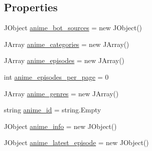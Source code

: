 \subsection*{Properties}
\begin{DoxyCompactItemize}
\item 
J\+Object \mbox{\hyperlink{class_little_weeb_library_1_1_models_1_1_json_kitsu_anime_info_aca4b832adca7f1916bee332b2b8b312f}{anime\+\_\+bot\+\_\+sources}} = new J\+Object()
\item 
J\+Array \mbox{\hyperlink{class_little_weeb_library_1_1_models_1_1_json_kitsu_anime_info_aaaa63157f78ca2cb7b9c08ba4092d6be}{anime\+\_\+categories}} = new J\+Array()
\item 
J\+Array \mbox{\hyperlink{class_little_weeb_library_1_1_models_1_1_json_kitsu_anime_info_ae788c0962dabe5e210fba53aecae820d}{anime\+\_\+episodes}} = new J\+Array()
\item 
int \mbox{\hyperlink{class_little_weeb_library_1_1_models_1_1_json_kitsu_anime_info_a11a2513ce95fe17d206eeb738811d087}{anime\+\_\+episodes\+\_\+per\+\_\+page}} = 0
\item 
J\+Array \mbox{\hyperlink{class_little_weeb_library_1_1_models_1_1_json_kitsu_anime_info_a72957f03d160801021514febcf127b8b}{anime\+\_\+genres}} = new J\+Array()
\item 
string \mbox{\hyperlink{class_little_weeb_library_1_1_models_1_1_json_kitsu_anime_info_a6a3974cec731d5a54452608449091130}{anime\+\_\+id}} = string.\+Empty
\item 
J\+Object \mbox{\hyperlink{class_little_weeb_library_1_1_models_1_1_json_kitsu_anime_info_a1a83f1d3043428e596a7a62ab36e27db}{anime\+\_\+info}} = new J\+Object()
\item 
J\+Object \mbox{\hyperlink{class_little_weeb_library_1_1_models_1_1_json_kitsu_anime_info_a53ef2cd169a3c8be49c809a10dbd1701}{anime\+\_\+latest\+\_\+episode}} = new J\+Object()

\end{DoxyCompactItemize}
